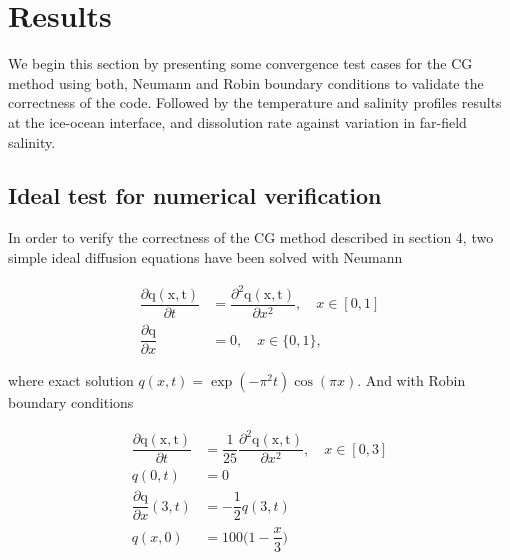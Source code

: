 \documentclass[11pt,a4paper]{article}
\begin{document}

	
	\section{Results}
	
	We begin this section by presenting some convergence test cases for the CG method using both, Neumann and Robin boundary conditions to validate the correctness of the code. Followed by the temperature and salinity profiles results at the ice-ocean interface, and dissolution rate against variation in far-field salinity.
	
	\subsection{Ideal test for numerical verification}
	
	In order to verify the correctness of the CG method described in section 4, two simple ideal diffusion equations have been solved with Neumann 
	
	\begin{align*}
	    \dfrac{\partial\mathrm{q(x,t)}}{\partial t} & = \dfrac{\partial^2\mathrm{q(x,t)}}{\partial x^2}, \quad x\in [0,1]\\
	    \dfrac{\partial\mathrm{q}}{\partial x} & = 0, \quad x\in \{0,1\},
	\end{align*}
	
	where exact solution $ q(x,t) = \exp(-\pi^2t)\cos(\pi x)$. And with Robin boundary conditions 
	
	\begin{align*}
	    \dfrac{\partial\mathrm{q(x,t)}}{\partial t} & = \dfrac{1}{25}\dfrac{\partial^2\mathrm{q(x,t)}}{\partial x^2}, \quad x\in [0,3]\\
	    q(0,t) &= 0\\
        \dfrac{\partial\mathrm{q}}{\partial x}(3,t) &= -\dfrac{1}{2}q(3,t)\\
        q(x,0) &= 100\bigg(1-\dfrac{x}{3}\bigg)\\
	\end{align*}
	
\end{document}
